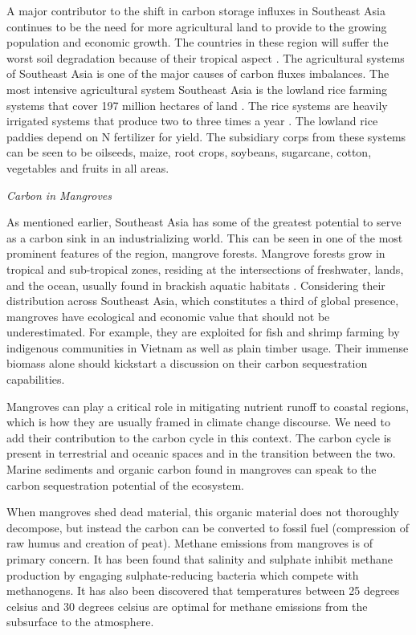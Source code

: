A major contributor to the shift in carbon storage influxes in Southeast Asia continues to be the need for more agricultural land to provide to the growing population and economic growth. The countries in these region will suffer the worst soil degradation because of their tropical aspect \citep{scherr1999soil}. The agricultural systems of Southeast Asia is one of the major causes of carbon fluxes imbalances. The most intensive agricultural system Southeast Asia is the lowland rice farming systems that cover 197 million hectares of land \citep{dixon2001nonalcoholic}. The rice systems are heavily irrigated systems that produce two to three times a year \citep{cassman1995extrapolating}. The lowland rice paddies depend on N fertilizer for yield. The subsidiary corps from these systems can be seen to be oilseeds, maize, root crops, soybeans, sugarcane, cotton, vegetables and fruits in all areas.



\textit{Carbon in Mangroves} 

As mentioned earlier, Southeast Asia has some of the greatest potential to serve as a carbon sink in an industrializing world. This can be seen in one of the most prominent features of the region, mangrove forests. Mangrove forests grow in tropical and sub-tropical zones, residing at the intersections of freshwater, lands, and the ocean, usually found in brackish aquatic habitats \citep{bravo2017managing}. Considering their distribution across Southeast Asia, which constitutes a third of global presence,  mangroves have ecological and economic value that should not be underestimated. For example, they are exploited for fish and shrimp farming by indigenous communities in Vietnam as well as plain timber usage. Their immense biomass alone should kickstart a discussion on their carbon sequestration capabilities.

Mangroves can play a critical role in mitigating nutrient runoff to coastal regions, which is how they are usually framed in climate change discourse. We need to add their contribution to the carbon cycle in this context. The carbon cycle is present in terrestrial and oceanic spaces and in the transition between the two. Marine sediments and organic carbon found in mangroves can speak to the carbon sequestration potential of the ecosystem.

When mangroves shed dead material, this organic material does not thoroughly decompose, but instead the carbon can be converted to fossil fuel (compression of raw humus and creation of peat). Methane emissions from mangroves is of primary concern. It has been found that salinity and sulphate inhibit methane production by engaging sulphate-reducing bacteria which compete with methanogens. It has also been discovered that temperatures between 25 degrees celsius and 30 degrees celsius are optimal for methane emissions from the subsurface to the atmosphere. 

